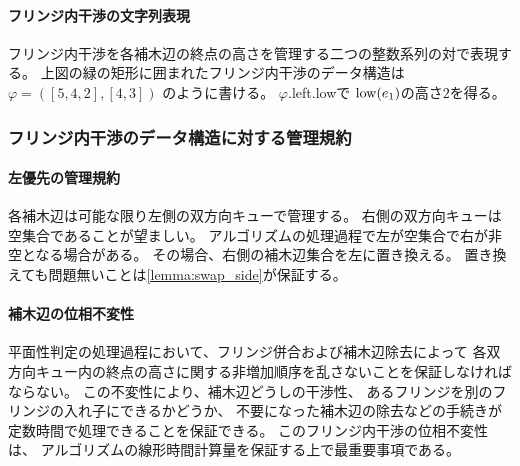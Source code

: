 \paragraph{フリンジ内干渉の文字列表現}
フリンジ内干渉を各補木辺の終点の高さを管理する二つの整数系列の対で表現する。
上図の緑の矩形に囲まれたフリンジ内干渉のデータ構造は%
$\varphi=([5,4,2], [4,3])$ のように書ける。
$\varphi$.left.lowで%
$\operatorname{low}(e_1)$の高さ$2$を得る。%


\subsubsection{フリンジ内干渉のデータ構造に対する管理規約}
\label{fop_specification}
\paragraph{左優先の管理規約}
各補木辺は可能な限り左側の双方向キューで管理する。
右側の双方向キューは空集合であることが望ましい。
アルゴリズムの処理過程で左が空集合で右が非空となる場合がある。
その場合、右側の補木辺集合を左に置き換える。
置き換えても問題無いことは\cref{lemma:swap_side}が保証する。

\paragraph{補木辺の位相不変性}
平面性判定の処理過程において、フリンジ併合および補木辺除去によって
各双方向キュー内の終点の高さに関する非増加順序を乱さないことを保証しなければならない。
この不変性により、補木辺どうしの干渉性、
あるフリンジを別のフリンジの入れ子にできるかどうか、
不要になった補木辺の除去などの手続きが
定数時間で処理できることを保証できる。
このフリンジ内干渉の位相不変性は、
アルゴリズムの線形時間計算量を保証する上で最重要事項である。






